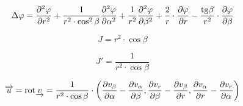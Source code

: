 \begin{equation}
\label{eq:sfericky_ss_div}
\Delta \varphi = \frac{\partial^2 \varphi}{\partial r^2} + \frac{1}{r^2 \cdot \cos^2 \beta} \frac{\partial^2 \varphi}{\partial \alpha^2} + \frac{1}{r^2} \frac{\partial^2 \varphi}{\partial \beta^2} + \frac{2}{r} \cdot \frac{\partial \varphi}{\partial r} - \frac{\mathrm{tg} \beta}{r^2} \cdot \frac{\partial \varphi}{\partial \beta}
\end{equation}

\begin{equation}
\label{eq:sfericky_ss_j}
J = r^2 \cdot \cos \beta
\end{equation}

\begin{equation}
\label{eq:sfericky_ss_j_inv}
J' = \frac{1}{r^2 \cdot \cos \beta}
\end{equation}

\begin{equation}
\label{eq:sfericky_ss_rotace}
\overrightarrow{u} = \mathrm{rot} \underrightarrow{v} = \frac{1}{r^2 \cdot \cos \beta} \cdot \left( \frac{\partial v_{\beta}}{\partial \alpha} - \frac{\partial v_{\alpha}}{\partial \beta}, \frac{\partial v_{r}}{\partial \beta} - \frac{\partial v_{\beta}}{\partial r}, \frac{\partial v_{\alpha}}{\partial r} - \frac{\partial v_{r}}{\partial \alpha} \right)
\end{equation}
